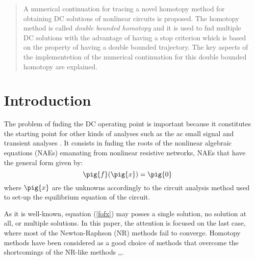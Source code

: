 \documentclass[conference]{IEEEtran}
\begin{document}

\maketitle



\begin{abstract}
A numerical continuation for tracing a novel homotopy method for obtaining  DC solutions of 
nonlinear circuits is proposed.
The homotopy method is called {\it double bounded homotopy} and it is used  to fnd multiple DC solutions 
with the advantage of having
a stop criterion  which is based on the property of having a double bounded trajectory. 
The key aspects of the implementetion of the numerical continuation
for this double bounded homotopy are explained.
\end{abstract}


\section{Introduction}







The problem of fnding the DC operating point is important because
it constitutes the starting point for other kinds of analyses such as
the ac small signal and transient analyses \cite{homo_ogrodzki}.
It consists in fnding the roots of the nonlinear algebraic equations
(NAEs) emanating from nonlinear resistive networks, NAEs that have the
general form given by:
\begin{equation}
\pig{f}(\pig{x}) = \pig{0}
\label{fofx}
\end{equation}
where $\pig{x}$ are the unknowns accordingly to the circuit analysis method
used to set-up the equilibrium equation of the circuit.
\par
As it is well-known, equation (\ref{fofx}) may posses a single solution,
no solution at all, or multiple solutions.
In this paper, the attention is focused on the last case, where most
of the Newton-Raphson (NR) methods fail to converge. Homotopy methods
have been considered as a good choice of methods that overcome the
shortcomings of the NR-like methods
\cite{homo_ArtificialP},\cite{homo_DWolfMulti},\cite{cont_leu1}.
\end{document}
